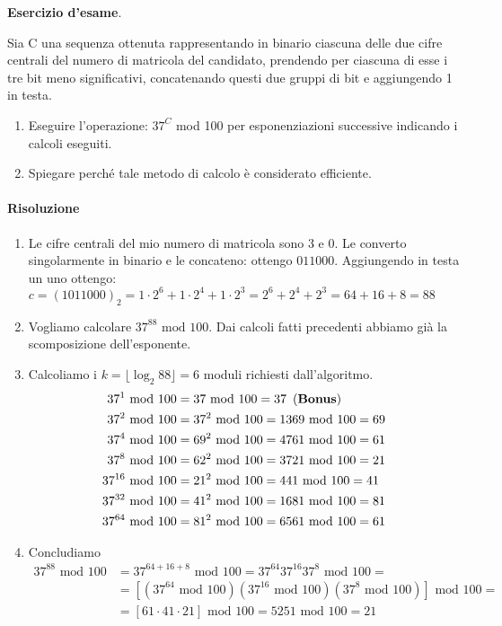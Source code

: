 \begin{framed}
	\noindent \textbf{Esercizio d'esame}.
	
	\noindent Sia C una sequenza ottenuta rappresentando in binario ciascuna delle due cifre centrali del
	numero di matricola del candidato, prendendo per ciascuna di esse i tre bit meno significativi,
	concatenando questi due gruppi di bit e aggiungendo 1 in testa.
	\begin{enumerate}
		\item Eseguire l’operazione: $37^C$ mod 100 per esponenziazioni successive indicando i calcoli eseguiti.
		\item Spiegare perché tale metodo di calcolo è considerato efficiente. 
	\end{enumerate}
	
	\paragraph{Risoluzione}
	\begin{enumerate}
		\item Le cifre centrali del mio numero di matricola sono $3$ e $0$. Le converto singolarmente in binario e le concateno: ottengo $011000$. Aggiungendo in testa un uno ottengo:
		$c=(1011000)_2=1\cdot 2^6 + 1 \cdot 2^4 + 1 \cdot 2^3 =2^6+2^4+2^3=64+16+8=88$
		\item Vogliamo calcolare $37^{88} \text{ mod } 100$. Dai calcoli fatti precedenti abbiamo già la scomposizione dell'esponente. 
		\item Calcoliamo i $k=\lfloor \log_2 88 \rfloor=6$ moduli richiesti dall'algoritmo. 
		\begin{align*}
			37^1 \text{ mod } 100&=37 \text{ mod } 100 = 37\,\,\, (\text{\textbf{Bonus}})\\
			37^2 \text{ mod } 100&=37^2 \text{ mod } 100= 1369 \text{ mod } 100 =69\\
			37^4 \text{ mod } 100&=69^2 \text{ mod } 100= 4761 \text{ mod } 100 =61\\
			37^8 \text{ mod } 100&=62^2 \text{ mod } 100= 3721 \text{ mod } 100 =21\\
			37^{16} \text{ mod } 100&=21^2 \text{ mod } 100= 441 \text{ mod } 100 =41\\
			37^{32} \text{ mod } 100&=41^2 \text{ mod } 100= 1681 \text{ mod } 100 =81\\
			37^{64} \text{ mod } 100&=81^2 \text{ mod } 100= 6561 \text{ mod } 100 =61
		\end{align*}
		\item Concludiamo
		\begin{align*}37^{88} \text{ mod } 100 &= 37^{64+16+8} \text{ mod } 100 = 37^{64}37^{16}37^8 \text{ mod } 100=\\&=\left[\left(37^{64}\text{ mod }100\right)\left(37^{16}\text{ mod }100\right)\left(37^{8}\text{ mod }100\right)\right] \text{ mod } 100=\\&=\left[61 \cdot 41 \cdot 21\right]\text{ mod }100=5251 \text{ mod } 100 = 21\end{align*}
	\end{enumerate}
\end{framed} 


